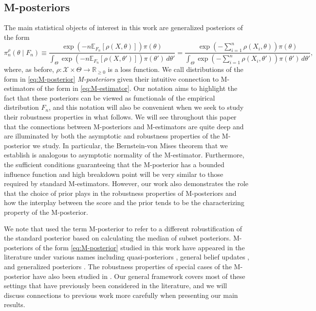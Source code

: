 \documentclass[11pt, oneside]{amsart}
\theoremstyle{definition}   %
\newcommand{\loss}{\rho}
\begin{document}
 \subsection{M-posteriors}
%
The main statistical objects of interest in this work are generalized posteriors of the form
%
\begin{equation}
\label{eq:M-posterior}
    \pi^\loss_{n}(\theta \mid F_n) \equiv \frac{\exp \left ( -n\mathbb{E}_{F_n}[\loss(X, \theta)]  \right ) \pi(\theta)}{\int_{\Theta} \exp \left ( -n \mathbb{E}_{F_n}[\loss(X, \theta')] \right )  \pi(\theta') \, d\theta'}=\frac{\exp \left ( -\sum_{i=1}^n \loss(X_i, \theta)  \right ) \pi(\theta)}{\int_{\Theta} \exp \left ( -\sum_{i=1}^n \loss(X_i, \theta') \right )  \pi(\theta') \, d\theta'},
\end{equation}
%
where, as before, $\rho:\mathcal{X}\times\Theta\to \mathbb{R}_{\geq 0}$ is a loss function.
We call distributions of the form in \eqref{eq:M-posterior} \emph{M-posteriors} given their intuitive connection to M-estimators of the form in \eqref{eq:M-estimator}. Our notation aims to highlight the fact that these posteriors can be viewed as functionals of the empirical distribution $F_n$, and this notation will also be convenient when we seek to study their robustness properties in what follows.
We will see throughout this paper that the connections between M-posteriors and M-estimators are quite deep and are illuminated by both the asymptotic  and  robustness properties of the M-posterior we study. In particular, the Bernstein-von Mises theorem that we establish is analogous to asymptotic normality of the M-estimator. Furthermore, the sufficient conditions guaranteeing that the M-posterior has a bounded influence function and high breakdown point will be very similar to those required by standard M-estimators. However, our work also demonstrates the role that the choice of prior plays in the robustness properties of M-posteriors and how the interplay between the score and the prior tends to be the characterizing property of the M-posterior.

We note that \cite{minsker:srivastava:lin:dunson2017} used the term M-posterior to refer to a different robustification of the standard posterior based on calculating the median of subset posteriors. M-posteriors of the form \eqref{eq:M-posterior} studied in this work have appeared in the literature under various names including quasi-posteriors \citep{chernozhukov:hong2003}, general belief updates \citep{bissiri:holmes:walker2016}, and generalized posteriors \citep{miller2021}. The robustness properties of special cases of the M-posterior have also been studied in \cite{hooker:vidyashankar2014,ghosh:basu2016,ghosh:majumder:basu2022,matsubara:knoblauch:briol:oates2022,altamirano:briol:knoblauch2023}. Our general framework covers most of these settings that have previously been considered in the literature, and we will discuss connections to previous work more carefully when presenting our main results.
\end{document}
